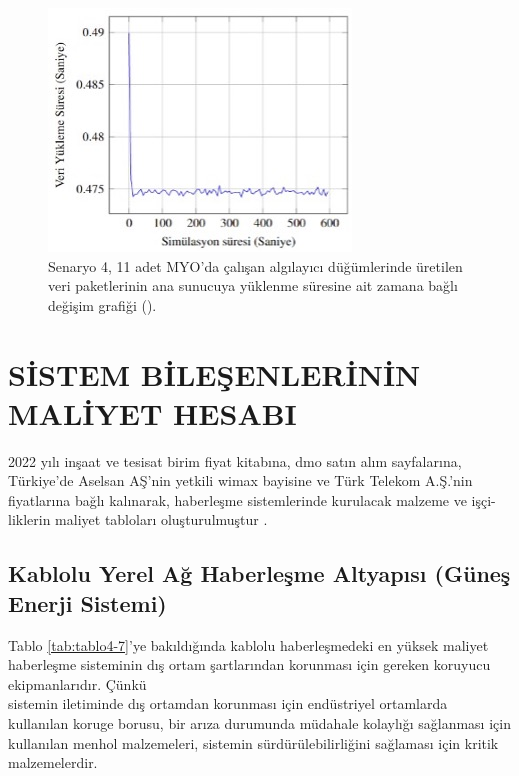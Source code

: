 \begin{figure}[htbp]
\centerline{\includegraphics[width= 8 cm]{Resim/senaryo4upload.jpg}}
\caption{Senaryo 4, 11 adet MYO'da çalışan algılayıcı düğümlerinde üretilen veri paketlerinin ana sunucuya yüklenme süresine ait zamana bağlı değişim grafiği (\protect{}).}
\label{fig:donmezsen4akatman}
\end{figure}



\section{SİSTEM BİLEŞENLERİNİN MALİYET HESABI}

2022 yılı inşaat ve tesisat birim fiyat kitabına, \gls{dmo} satın alım sayfalarına, Türkiye’de Aselsan AŞ’nin yetkili \gls{wimax} bayisine ve Türk Telekom A.Ş.’nin fiyatlarına bağlı kalınarak, haberleşme sistemlerinde kurulacak malzeme ve işçi-liklerin maliyet tabloları oluşturulmuştur \cite{birimfiyat}.




\subsection{Kablolu Yerel Ağ Haberleşme Altyapısı (Güneş Enerji Sistemi)}


Tablo \ref{tab:tablo4-7}’ye bakıldığında kablolu haberleşmedeki en yüksek maliyet haberleşme sisteminin dış ortam şartlarından korunması için gereken koruyucu ekipmanlarıdır. Çünkü\\ sistemin iletiminde dış ortamdan korunması için endüstriyel ortamlarda kullanılan koruge borusu, bir arıza durumunda müdahale kolaylığı sağlanması için kullanılan menhol malzemeleri, sistemin sürdürülebilirliğini sağlaması için kritik malzemelerdir.


